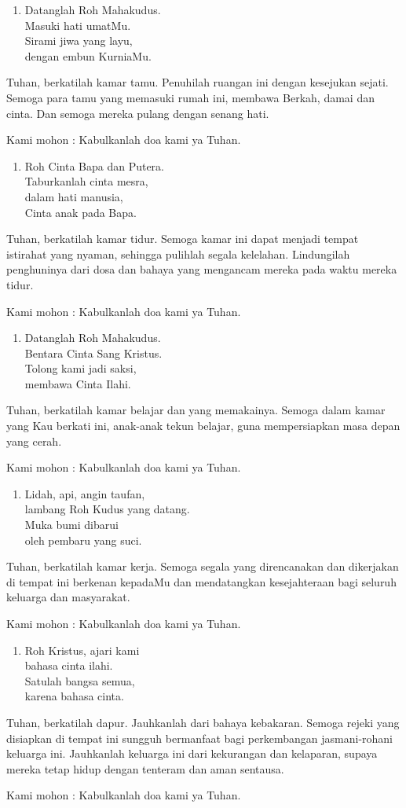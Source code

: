 \documentclass[12pt,twoside,anypage]{scrbook}
\makeatletter
\renewenvironment{description}
               {\list{}{\labelwidth\z@ \itemindent-\leftmargin
                        \let\makelabel\descriptionlabel}}
               {\endlist}
\renewcommand*\descriptionlabel[1]{\hspace\labelsep 
                                \normalfont\bfseries #1 }
\newcommand{\doa}[2]{%
  \begin{description}
  \item[Doa untuk #1] #2
   
   Kami mohon : Kabulkanlah doa kami ya Tuhan.
  \end{description}
}
\newcommand{\bait}[1]{%
  \begin{enumerate}
  \slshape
  \setcounter{enumi}{\value{urut}}
  \item #1
  \setcounter{urut}{\value{enumi}}
  \end{enumerate}	
}
\makeatother
\begin{document}
\bait{Datanglah Roh Mahakudus. \\Masuki hati umatMu. \\Sirami jiwa yang layu, \\dengan embun KurniaMu.}

\doa{kamar tamu}{%
Tuhan, berkatilah kamar tamu. Penuhilah ruangan ini dengan kesejukan sejati. Semoga para tamu yang memasuki rumah ini, membawa Berkah, damai dan cinta. Dan semoga mereka pulang dengan senang hati.}

\bait{Roh Cinta Bapa dan Putera.\\ Taburkanlah cinta mesra,\\ dalam hati manusia,\\ Cinta anak pada Bapa.}

\doa{kamar tidur}{
Tuhan, berkatilah kamar tidur. Semoga kamar ini dapat menjadi tempat istirahat yang nyaman, sehingga pulihlah segala kelelahan. Lindungilah penghuninya dari dosa dan bahaya yang mengancam mereka pada waktu mereka tidur.}

\bait{Datanglah Roh Mahakudus.\\ Bentara Cinta Sang Kristus.\\ Tolong kami jadi saksi,\\ membawa Cinta Ilahi.}

\doa{kamar belajar}{
Tuhan, berkatilah kamar belajar dan yang memakainya. Semoga dalam kamar yang Kau berkati ini, anak-anak tekun belajar, guna mempersiapkan masa depan yang cerah.}

\bait{Lidah, api, angin taufan,\\ lambang Roh Kudus yang datang.\\ Muka bumi dibarui \\oleh pembaru yang suci.}

\doa{kamar kerja}{
Tuhan, berkatilah kamar kerja. Semoga segala yang direncanakan dan dikerjakan di tempat ini berkenan kepadaMu dan mendatangkan kesejahteraan bagi seluruh keluarga dan masyarakat.}

\bait{Roh Kristus, ajari kami\\ bahasa cinta ilahi. \\Satulah bangsa semua,\\ karena bahasa cinta.}

\doa{dapur}{
Tuhan, berkatilah dapur. Jauhkanlah dari bahaya kebakaran. Semoga rejeki yang disiapkan di tempat ini sungguh bermanfaat bagi perkembangan jasmani-rohani keluarga ini. Jauhkanlah keluarga ini dari kekurangan dan kelaparan, supaya mereka tetap hidup dengan tenteram dan aman sentausa.}
\end{document}
